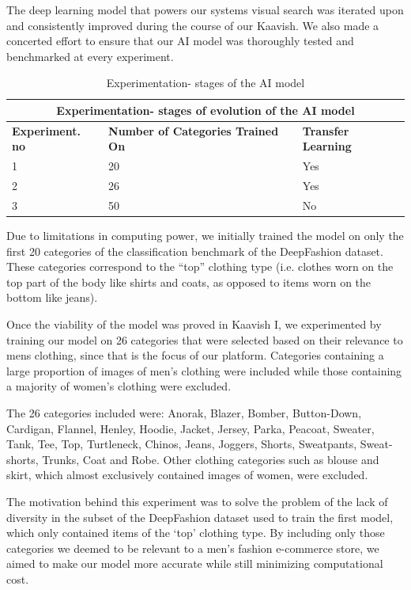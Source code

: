 The deep learning model that powers our systems visual search was iterated upon and consistently improved during the course of our Kaavish. We also made a concerted effort to ensure that our AI model was thoroughly tested and benchmarked at every experiment.

\begin{table}[H]
\begin{tabular}{ @{}|p{4cm}|p{5cm}|p{5cm}|  }
 \hline
 \multicolumn{3}{|c|}{\textbf{Experimentation- stages of evolution of the AI model}} \\
 \hline
 \textbf{Experiment. no} & \textbf{Number of Categories Trained On} & \textbf{Transfer Learning}\\
 
\hline
 1 & 20 & Yes \\ 
 \hline
 2 & 26 & Yes \\ 
 \hline
  3 & 50 & No \\
 \hline
\end{tabular}
\caption{Experimentation- stages of the AI model}
\label{table:Experimentation- stages of AI model}
\end{table}


Due to limitations in computing power, we initially trained the model on only the first 20 categories of the classification benchmark of the DeepFashion dataset. These categories correspond to the “top” clothing type (i.e. clothes worn on the top part of the body like shirts and coats, as opposed to items worn on the bottom like jeans). 

Once the viability of the model was proved in Kaavish I, we experimented by training our model on 26 categories that were selected based on their relevance to mens clothing, since that is the focus of our platform. Categories containing a large proportion of images of men's clothing were included while those containing a majority of women's clothing were excluded. 

The 26 categories included were: Anorak, Blazer, Bomber, Button-Down, Cardigan, Flannel, Henley, Hoodie, Jacket, Jersey, Parka, Peacoat, Sweater, Tank, Tee, Top, Turtleneck, Chinos, Jeans, Joggers, Shorts, Sweatpants, Sweat-shorts, Trunks, Coat and Robe. Other clothing categories such as blouse and skirt, which almost exclusively contained images of women, were excluded.

The motivation behind this experiment was to solve the problem of the lack of diversity in the subset of the DeepFashion dataset used to train the first model, which only contained items of the ‘top’ clothing type. By including only those categories we deemed to be relevant to a men’s fashion e-commerce store, we aimed to make our model more accurate while still minimizing computational cost. 

